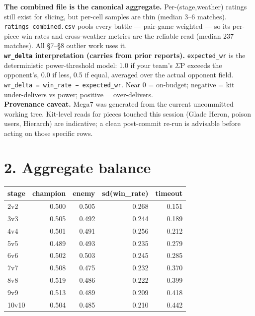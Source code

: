 \documentclass[10pt]{article}
\begin{document}
\textbf{The combined file is the canonical aggregate.} Per-(stage,weather) ratings still exist for slicing, but per-cell samples are thin (median 3--6 matches). \texttt{ratings\_\allowbreak{}combined.\allowbreak{}csv} pools every battle --- pair-game weighted --- so its per-piece win rates and cross-weather metrics are the reliable read (median 237 matches). All \S{}7--\S{}8 outlier work uses it.\\

\textbf{\texttt{wr\_\allowbreak{}delta} interpretation (carries from prior reports).} \texttt{expected\_\allowbreak{}wr} is the deterministic power-threshold model: 1.0 if your team's $\Sigma$P exceeds the opponent's, 0.0 if less, 0.5 if equal, averaged over the actual opponent field. \texttt{wr\_\allowbreak{}delta = win\_\allowbreak{}rate − expected\_\allowbreak{}wr}. Near 0 = on-budget; negative = kit under-delivers vs power; positive = over-delivers.\\

\textbf{Provenance caveat.} Mega7 was generated from the current uncommitted working tree. Kit-level reads for pieces touched this session (Glade Heron, poison users, Hierarch) are indicative; a clean post-commit re-run is advisable before acting on those specific rows.\\

\section*{2. Aggregate balance}

\medskip
\begin{tabularx}{\linewidth}{Lrrrr}
\toprule
\textbf{stage} & \textbf{champion} & \textbf{enemy} & \textbf{sd(win\_rate)} & \textbf{timeout} \\
\midrule
2v2 & 0.500 & 0.505 & 0.268 & 0.151 \\
3v3 & 0.505 & 0.492 & 0.244 & 0.189 \\
4v4 & 0.501 & 0.491 & 0.256 & 0.212 \\
5v5 & 0.489 & 0.493 & 0.235 & 0.279 \\
6v6 & 0.502 & 0.503 & 0.245 & 0.285 \\
7v7 & 0.508 & 0.475 & 0.232 & 0.370 \\
8v8 & 0.519 & 0.486 & 0.222 & 0.399 \\
9v9 & 0.513 & 0.489 & 0.209 & 0.418 \\
10v10 & 0.504 & 0.485 & 0.210 & 0.442 \\
\bottomrule
\end{tabularx}
\medskip
\end{document}
